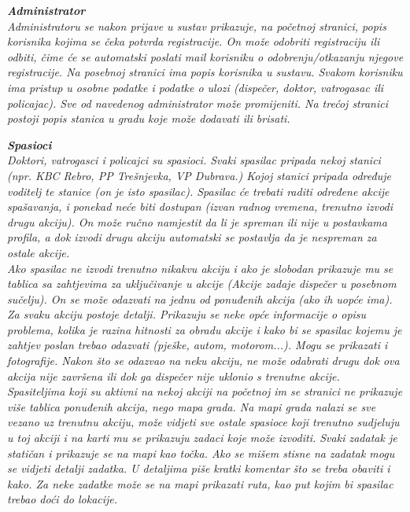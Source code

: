 		\textbf{\textit{Administrator}}\\
		\textit{Administratoru se nakon prijave u sustav prikazuje, na početnoj stranici, popis korisnika kojima se čeka potvrda registracije. On može odobriti registraciju ili odbiti, čime će se automatski poslati mail korisniku o odobrenju/otkazanju njegove registracije. Na posebnoj stranici ima popis korisnika u sustavu. Svakom korisniku ima pristup u osobne podatke i podatke o ulozi (dispečer, doktor, vatrogasac ili policajac). Sve od navedenog administrator može promijeniti. Na trećoj stranici postoji popis stanica u gradu koje može dodavati ili brisati.}
		
		\textbf{\textit{Spasioci}}\\
		\textit{Doktori, vatrogasci i policajci su spasioci. Svaki spasilac pripada nekoj stanici (npr. KBC Rebro, PP Trešnjevka, VP Dubrava.) Kojoj stanici pripada određuje voditelj te stanice (on je isto spasilac). Spasilac će trebati raditi određene akcije spašavanja, i ponekad neće biti dostupan (izvan radnog vremena, trenutno izvodi drugu akciju). On može ručno namjestit da li je spreman ili nije u postavkama profila, a dok izvodi drugu akciju automatski se postavlja da je nespreman za ostale akcije.\\
		Ako spasilac ne izvodi trenutno nikakvu akciju i ako je slobodan prikazuje mu se tablica sa zahtjevima za uključivanje u akcije (Akcije zadaje dispečer u posebnom sučelju). On se može odazvati na jednu od ponuđenih akcija (ako ih uopće ima). Za svaku akciju postoje detalji. Prikazuju se neke opće informacije o opisu problema, kolika je razina hitnosti za obradu akcije i kako bi se spasilac kojemu je zahtjev poslan trebao odazvati (pješke, autom, motorom...). Mogu se prikazati i fotografije. Nakon što se odazvao na neku akciju, ne može odabrati drugu dok ova akcija nije završena ili dok ga dispečer nije uklonio s trenutne akcije.\\
		Spasiteljima koji su aktivni na nekoj akciji na početnoj im se stranici ne prikazuje više tablica ponuđenih akcija, nego mapa grada. Na mapi grada nalazi se sve vezano uz trenutnu akciju, može vidjeti sve ostale spasioce koji trenutno sudjeluju u toj akciji i na karti mu se prikazuju zadaci koje može izvoditi. Svaki zadatak je statičan i prikazuje se na mapi kao točka. Ako se mišem stisne na zadatak mogu se vidjeti detalji zadatka. U detaljima piše kratki komentar što se treba obaviti i kako. Za neke zadatke može se na mapi prikazati ruta, kao put kojim bi spasilac trebao doći do lokacije.
		}
	
